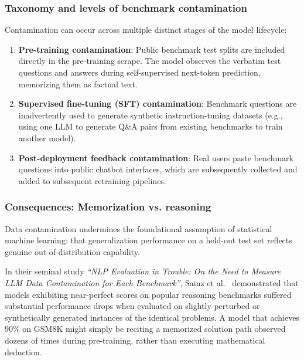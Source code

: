 \documentclass[../../main.tex]{subfiles}
\begin{document}
\subsubsection{Taxonomy and levels of benchmark contamination}
Contamination can occur across multiple distinct stages of the model lifecycle:
\begin{enumerate}
    \item \textbf{Pre-training contamination}: Public benchmark test splits are included directly in the pre-training scrape. The model observes the verbatim test questions and answers during self-supervised next-token prediction, memorizing them as factual text.
    \item \textbf{Supervised fine-tuning (SFT) contamination}: Benchmark questions are inadvertently used to generate synthetic instruction-tuning datasets (e.g., using one LLM to generate Q\&A pairs from existing benchmarks to train another model).
    \item \textbf{Post-deployment feedback contamination}: Real users paste benchmark questions into public chatbot interfaces, which are subsequently collected and added to subsequent retraining pipelines.
\end{enumerate}

\subsubsection{Consequences: Memorization vs. reasoning}
Data contamination undermines the foundational assumption of statistical machine learning: that generalization performance on a held-out test set reflects genuine out-of-distribution capability.

In their seminal study \textit{``NLP Evaluation in Trouble: On the Need to Measure LLM Data Contamination for Each Benchmark''}, Sainz et al.~\cite{sainz2023contamination} demonstrated that models exhibiting near-perfect scores on popular reasoning benchmarks suffered substantial performance drops when evaluated on slightly perturbed or synthetically generated instances of the identical problems. A model that achieves $90\%$ on GSM8K might simply be reciting a memorized solution path observed dozens of times during pre-training, rather than executing mathematical deduction.
\end{document}

